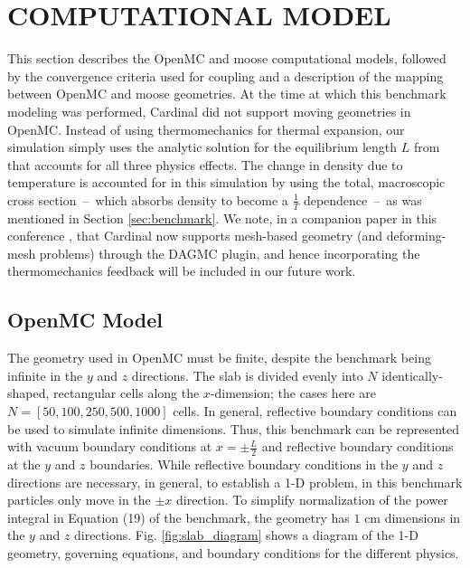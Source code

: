 \documentclass[letterpaper]{mc2023}
\begin{document}
\section{COMPUTATIONAL MODEL}\label{sec:model}
This section describes the OpenMC and \gls{moose} computational models, followed by the convergence criteria used for coupling
and a description of the mapping between OpenMC and \gls{moose} geometries. At the time at which this benchmark modeling was
performed, Cardinal did not support moving geometries in OpenMC. Instead of using thermomechanics for thermal expansion, our
simulation simply uses the analytic solution for the equilibrium length $L$ from \cite{analytical-benchmark} that accounts for
all three physics effects. The change in density due to temperature is accounted for in this simulation by using the total,
macroscopic cross section\ --\ which absorbs density to become a $\frac{1}{T}$ dependence\ --\ as was mentioned in Section
\ref{sec:benchmark}. We note, in a companion paper in this conference \cite{novak-2023}, that Cardinal now supports mesh-based
geometry (and deforming-mesh problems) through the DAGMC plugin, and hence incorporating the thermomechanics feedback will be
included in our future work.

\subsection{OpenMC Model}
\label{sec:model:OpenMC}
The geometry used in OpenMC must be finite, despite the benchmark being infinite in the $y$ and $z$ directions. The slab
is divided evenly into $N$ identically-shaped, rectangular cells along the $x$-dimension; the cases here are $N=[50,100,250,500,1000]$
cells. In general, reflective boundary conditions can be used to simulate infinite dimensions. Thus, this benchmark can be
represented with vacuum boundary conditions at $x=\pm \frac{L}{2}$ and reflective boundary conditions at the $y$ and $z$ boundaries.
While reflective boundary conditions in the $y$ and $z$ directions are necessary, in general, to establish a 1-D problem, in this
benchmark particles only move in the $\pm x$ direction. To simplify normalization of the power integral in Equation (19) of the
benchmark, the geometry has $1$ cm dimensions in the $y$ and $z$ directions\cite{analytical-benchmark}. Fig. \ref{fig:slab_diagram}
shows a diagram of the 1-D geometry, governing equations, and boundary conditions for the different physics.
\end{document}
